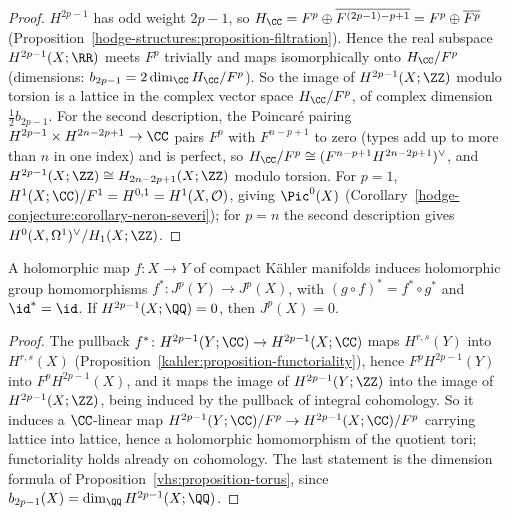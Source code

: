 \begin{proof}
$H^{2p-1}$ has odd weight $2p - 1$, so $H_\CC = F^p \oplus \overline{F^{(2p-1)-p+1}} = F^p \oplus \overline{F^p}$ (Proposition~\ref{hodge-structures:proposition-filtration}). Hence the real subspace
$H^{2p-1}(X; \RR)$ meets $F^p$ trivially and maps isomorphically onto $H_\CC/F^p$ (dimensions: $b_{2p-1} = 2\dim_\CC H_\CC/F^p$). So the image of $H^{2p-1}(X; \ZZ)$ modulo torsion is a lattice in
the complex vector space $H_\CC/F^p$, of complex dimension $\frac12b_{2p-1}$. For the second description, the Poincar\'e pairing $H^{2p-1} \times H^{2n-2p+1} \to \CC$ pairs $F^p$ with
$F^{n-p+1}$ to zero (types add up to more than $n$ in one index) and is perfect, so $H_\CC/F^p \cong (F^{n-p+1}H^{2n-2p+1})^\vee$, and $H^{2p-1}(X; \ZZ) \cong H_{2n-2p+1}(X; \ZZ)$ modulo torsion.
For $p = 1$, $H^1(X; \CC)/F^1 = H^{0,1} = H^1(X, \mathcal{O})$, giving $\Pic^0(X)$ (Corollary~\ref{hodge-conjecture:corollary-neron-severi}); for $p = n$ the second description gives
$H^0(X, \Omega^1)^\vee/H_1(X; \ZZ)$.
\end{proof}

\begin{proposition}\label{vhs:proposition-functoriality}
A holomorphic map $f \colon X \to Y$ of compact K\"ahler manifolds induces holomorphic group homomorphisms $f^* \colon J^p(Y) \to J^p(X)$, with $(g \circ f)^* = f^* \circ g^*$ and $\id^* = \id$. If
$H^{2p-1}(X; \QQ) = 0$, then $J^p(X) = 0$.
\end{proposition}

\begin{proof}
The pullback $f^* \colon H^{2p-1}(Y; \CC) \to H^{2p-1}(X; \CC)$ maps $H^{r,s}(Y)$ into $H^{r,s}(X)$ (Proposition~\ref{kahler:proposition-functoriality}), hence $F^pH^{2p-1}(Y)$ into
$F^pH^{2p-1}(X)$, and it maps the image of $H^{2p-1}(Y; \ZZ)$ into the image of $H^{2p-1}(X; \ZZ)$, being induced by the pullback of integral cohomology. So it induces a $\CC$-linear map
$H^{2p-1}(Y; \CC)/F^p \to H^{2p-1}(X; \CC)/F^p$ carrying lattice into lattice, hence a holomorphic homomorphism of the quotient tori; functoriality holds already on cohomology. The last statement is
the dimension formula of Proposition~\ref{vhs:proposition-torus}, since $b_{2p-1}(X) = \dim_\QQ H^{2p-1}(X; \QQ)$.
\end{proof}

